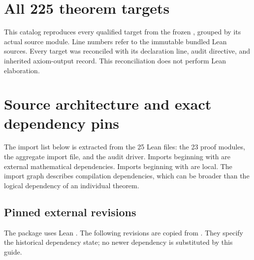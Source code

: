 \section{All 225 theorem targets}
\label{sec:targets}
This catalog reproduces every qualified target from the frozen , grouped by its actual source module. Line numbers refer to the immutable bundled Lean sources. Every target was reconciled with its declaration line, audit directive, and inherited axiom-output record. This reconciliation does not perform Lean elaboration.

\clearpage
\section{Source architecture and exact dependency pins}
\label{sec:imports}
The import list below is extracted from the 25 Lean files: the 23 proof modules, the aggregate import file, and the audit driver. Imports beginning with  are external mathematical dependencies. Imports beginning with  are local. The import graph describes compilation dependencies, which can be broader than the logical dependency of an individual theorem.

\subsection{Pinned external revisions}
The package uses Lean . The following revisions are copied from . They specify the historical dependency state; no newer dependency is substituted by this guide.


